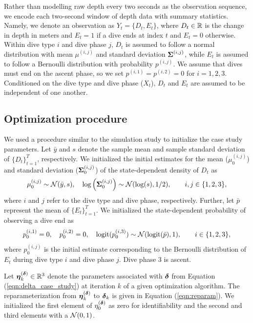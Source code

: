 Rather than modelling raw depth every two seconds as the observation sequence, we encode each two-second window of depth data with summary statistics. Namely, we denote an observation as $Y_t = \{D_t,E_t\}$, where $D_t \in \mathbb{R}$ is the change in depth in meters and $E_t = 1$ if a dive ends at index $t$ and $E_t = 0$ otherwise. 
Within dive type $i$ and dive phase $j$, $D_t$ is assumed to follow a normal distribution with mean $\mu^{(i,j)}$ and standard deviation $\boldsymbol{\Sigma}^{(i,j)}$, while $E_t$ is assumed to follow a Bernoulli distribution with probability $p^{(i,j)}$. We assume that dives must end on the ascent phase, so we set $p^{(i,1)} = p^{(i,2)} = 0$ for $i = 1,2,3$. Conditioned on the dive type and dive phase ($X_t$), $D_t$ and $E_t$ are assumed to be independent of one another.

\subsection{Optimization procedure}

We used a procedure similar to the simulation study to initialize the case study parameters. Let $\bar y$ and $s$ denote the sample mean and sample standard deviation of $\{D_t\}_{t=1}^T$, respectively. We initialized the initial estimates for the mean ($\mu^{(i,j)}_0$) and standard deviation ($\boldsymbol{\Sigma}^{(i,j)}_0$) of the state-dependent density of $D_t$ as
%
\begin{equation}
    \mu^{(i,j)}_0 \sim \mathcal{N}(\bar y, s), \quad \log\left(\boldsymbol{\Sigma}^{(i,j)}_0\right) \sim \mathcal{N}(\log(s),1/2), \qquad i,j \in \{1,2,3\},
\end{equation}
%
where $i$ and $j$ refer to the dive type and dive phase, respectively. Further, let $\bar p$ represent the mean of $\{E_t\}_{t=1}^T$. We initialized the state-dependent probability of observing a dive end as
%
\begin{equation}
    p^{(i,1)}_0 = 0, \quad p^{(i,2)}_0 = 0, \quad \operatorname*{logit}(p^{(i,3)}_0) \sim \mathcal{N}(\operatorname*{logit}(\bar p),1), \qquad i \in \{1,2,3\},
\end{equation}
%
where $p^{(i,j)}_0$ is the initial estimate corresponding to the Bernoulli distribution of $E_t$ during dive type $i$ and dive phase $j$. Dive phase 3 is ascent.

Let $\boldsymbol{\eta}^{(\boldsymbol{\delta})}_k \in \mathbb{R}^3$ denote the parameters associated with $\boldsymbol{\delta}$ from Equation (\ref{eqn:delta_case_study}) at iteration $k$ of a given optimization algorithm. The reparameterization from $\boldsymbol{\eta}^{(\boldsymbol{\delta})}_k$ to $\boldsymbol{\delta}_k$ is given in Equation (\ref{eqn:reparam}). We initialized the first element of $\eta^{(\boldsymbol{\delta})}_0$ as zero for identifiability and the second and third elements with a $\mathcal{N}(0,1)$.

